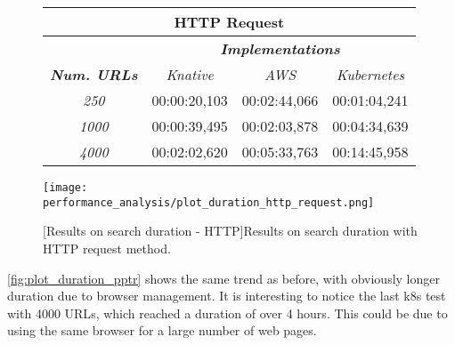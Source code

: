 \documentclass[../thesis.tex]{subfiles}
\begin{document}
\begin{figure}[H]
    \centering
    \begin{tabular}{|c|c|c|c|}
        \hline
        \multicolumn{4}{|c|}{\textbf{HTTP Request}} \\
        \hline
        & \multicolumn{3}{c|}{\textit{\textbf{Implementations}}} \\
        \hline
        \textit{\textbf{Num. URLs}} & \multicolumn{1}{c|}{\textit{Knative}} & \multicolumn{1}{c|}{\textit{AWS}} & \multicolumn{1}{c|}{\textit{Kubernetes}} \\
        \hline
        \textit{250} & 00:00:20,103 & 00:02:44,066 & 00:01:04,241 \\
        \hline
        \textit{1000} & 00:00:39,495 & 00:02:03,878 & 00:04:34,639 \\
        \hline
        \textit{4000} & 00:02:02,620 & 00:05:33,763 & 00:14:45,958 \\
        \hline
    \end{tabular}
    
    \vspace{\floatsep}

    \texttt{[image: performance\_analysis/plot\_duration\_http\_request.png]}

    [Results on search duration - HTTP]{Results on search duration with \acrshort{HTTP} request method.}\label{fig:plot_duration_http_request}
\end{figure}

\newpage

\autoref{fig:plot_duration_pptr} shows the same trend as before, with obviously longer duration due to browser management. It is interesting to notice the last \gls{k8s} test with 4000 \acrshort{URL}s, which reached a duration of over 4 hours. This could be due to using the same browser for a large number of web pages.

\vspace*{5cm}
\end{document}

